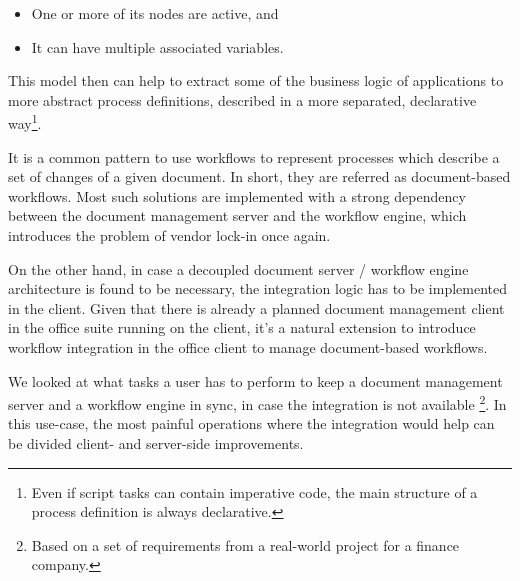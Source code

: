 \begin{itemize}
\item One or more of its nodes are active, and
\item It can have multiple associated variables.
\end{itemize}

This model then can help to extract some of the business logic of applications
to more abstract process definitions, described in a more separated,
declarative way\footnote{Even if script tasks can contain imperative code, the
main structure of a process definition is always declarative.}.

It is a common pattern to use workflows to represent processes which describe a
set of changes of a given document. In short, they are referred as
document-based workflows. Most such solutions are implemented with a strong
dependency between the document management server and the workflow engine,
which introduces the problem of vendor lock-in once again.

On the other hand, in case a decoupled document server / workflow engine
architecture is found to be necessary, the integration logic has to be implemented
in the client. Given that there is already a planned document management client
in the office suite running on the client, it's a natural extension to
introduce workflow integration in the office client to manage document-based
workflows.

We looked at what tasks a user has to perform to keep a document management
server and a workflow engine in sync, in case the integration is not available
\footnote{Based on a set of requirements from a real-world project for a
finance company.}.  In this use-case, the most painful operations where the
integration would help can be divided client- and server-side improvements.

